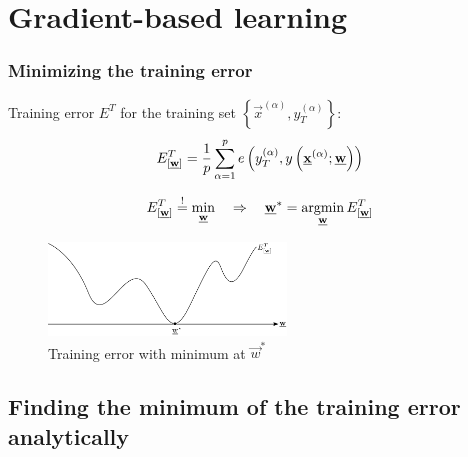 \section{Gradient-based learning}

\begin{frame}\frametitle{Minimizing the training error}
	Training error $E^T$ for the training set $\left\{\vec x^{(\alpha)}, y^{(\alpha)}_{T}\right\}$: 
    \begin{equation}
        {E}^T_{[\underline{\mathbf{w}}]} = \frac{1}{p} \sum\limits_{\alpha = 1}^p 
					e\left(y^{(\alpha)}_T, y\left(\underline{\mathbf{x}}^{(\alpha)}; \underline{\mathbf{w}}\right)\right)
    \end{equation}
    
    
    \begin{equation}
        \ETw \eqexcl \min_{\vec w} \quad \Rightarrow \quad \vec w^{*} = \argmin_{\vec w} \ETw
    \end{equation}

    \begin{figure}[h]
        \centering
        \includegraphics[height=2.5cm]{img/section1_fig19_no_steps}
        \caption{Training error with minimum at $\vec w^{*}$}
        \label{fig:training_error} 
    \end{figure}
    \slidesonly{\vspace{-10mm}}
    
    \pause 

\end{frame}

\subsection{Finding the minimum of the training error analytically}

